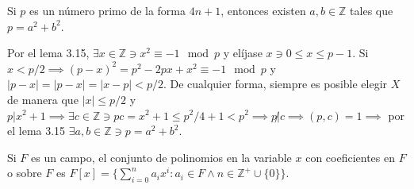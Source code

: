 \begin{teorema}[3.6 - Fermat]
    Si $p$ es un número primo de la forma $4n+1$, entonces existen $a,b\in\mathbb{Z}$ tales que $p=a^2+b^2$. 
    \begin{dem}
        Por el lema 3.15, $\exists x\in\mathbb{Z}\ni x^2\equiv -1\mod p$ y elíjase $x\ni 0\leq x\leq p-1$. Si $x<p/2\implies (p-x)^2=p^2-2px+x^2\equiv -1\mod p$ y $|p-x|=|p-x|=|x-p|<p/2$. De cualquier forma, siempre es posible elegir $X$ de manera que $|x|\leq p/2$ y $p|x^2+1\implies \exists c\in\mathbb{Z}\ni pc=x^2+1\leq p^2/4+1<p^2\implies p\not|c\implies (p,c)=1\implies$ por el lema 3.15 $\exists a,b\in\mathbb{Z}\ni p=a^2+b^2$.
    \end{dem}
\end{teorema}

\begin{definicion}
    Si $F$ es un campo, el conjunto de polinomios en la variable $x$ con coeficientes en $F$ o sobre $F$ es $F[x]=\{\sum_{i=0}^n a_ix^i : a_i\in F \wedge n\in\mathbb{Z}^+\cup \{0\}\}$.
\end{definicion}